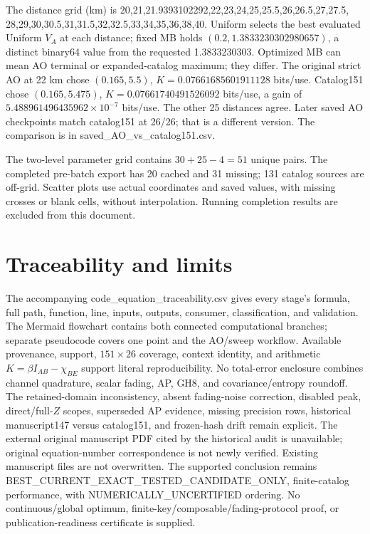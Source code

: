 \documentclass[11pt]{article}
\begin{document}
The distance grid (km) is 20,21,21.9393102292,22,23,24,25,25.5,26,26.5,27,27.5,
28,29,30,30.5,31,31.5,32,32.5,33,34,35,36,38,40.
Uniform selects the best evaluated Uniform $V_A$ at each distance; fixed MB holds
$(0.2,1.3833230302980657)$, a distinct binary64 value from the requested 1.3833230303.
Optimized MB can mean AO terminal or expanded-catalog maximum; they differ.
The original strict AO at 22 km chose $(0.165,5.5)$,
$K=0.07661685601911128$ bits/use.
Catalog151 chose $(0.165,5.475)$, $K=0.07661740491526092$ bits/use,
a gain of $5.488961496435962\times10^{-7}$ bits/use.
The other 25 distances agree. Later saved AO checkpoints match catalog151 at 26/26;
that is a different version. The comparison is in saved\_AO\_vs\_catalog151.csv.

The two-level parameter grid contains $30+25-4=51$ unique pairs. The completed pre-batch
export has 20 cached and 31 missing; 131 catalog sources are off-grid.
Scatter plots use actual coordinates and saved values, with missing crosses or blank cells,
without interpolation. Running completion results are excluded from this document.

\section{Traceability and limits}
The accompanying code\_equation\_traceability.csv gives every stage's formula,
full path, function, line, inputs, outputs, consumer, classification, and validation.
The Mermaid flowchart contains both connected computational branches;
separate pseudocode covers one point and the AO/sweep workflow.
Available provenance, support, $151\times26$ coverage, context identity, and
arithmetic $K=\beta I_{AB}-\chi_{BE}$ support literal reproducibility.
No total-error enclosure combines channel quadrature, scalar fading,
AP, GH8, and covariance/entropy roundoff.
The retained-domain inconsistency, absent fading-noise correction, disabled peak,
direct/full-$Z$ scopes, superseded AP evidence, missing precision rows,
historical manuscript147 versus catalog151, and frozen-hash drift remain explicit.
The external original manuscript PDF cited by the historical audit is
unavailable; original equation-number correspondence is not newly verified.
Existing manuscript files are not overwritten.
The supported conclusion remains BEST\_CURRENT\_EXACT\_TESTED\_CANDIDATE\_ONLY,
finite-catalog performance, with NUMERICALLY\_UNCERTIFIED ordering.
No continuous/global optimum, finite-key/composable/fading-protocol proof, or
publication-readiness certificate is supplied.
\end{document}
